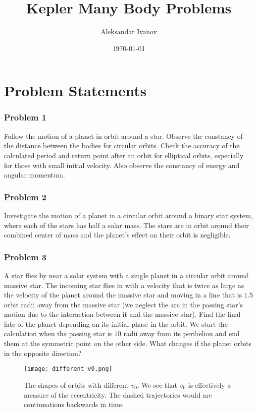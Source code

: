 \documentclass[10pt,a4paper,twocolumn]{article}
\begin{document}
\title{Kepler Many Body Problems}
\author{Aleksandar Ivanov}
\date{\today}
\maketitle

\section{Problem Statements}

\subsubsection*{Problem 1}

Follow the motion of a planet in orbit around a star. Observe the constancy of the distance between the bodies for circular orbits. Check the accuracy of the calculated period and return point after an orbit for elliptical orbits, especially for those with small initial velocity. Also observe the constancy of energy and angular momentum.

\subsubsection*{Problem 2}

Investigate the motion of a planet in a circular orbit around a binary star system, where each of the stars has half a solar mass. The stars are in orbit around their combined center of mass and the planet's effect on their orbit is negligible.

\subsubsection*{Problem 3}

A star flies by near a solar system with a single planet in a circular orbit around massive star. The incoming star flies in with a velocity that is twice as large as the velocity of the planet around the massive star and moving in a line that is $1.5$ orbit radii away from the massive star (we neglect the arc in the passing star's motion due to the interaction between it and the massive star). Find the final fate of the planet depending on its initial phase in the orbit. We start the calculation when the passing star is $10$ radii away from its perihelion and end them at the symmetric point on the other side. What changes if the planet orbits in the opposite direction?

\begin{figure}[t]
    \centering
    \texttt{[image: different\_v0.png]}
    \caption{The shapes of orbits with different $v_0$. We see that $v_0$ is effectively a measure of the eccentricity. The dashed trajectories would are continuations backwards in time.}
    \label{fig:diff_v0}
\end{figure}
\end{document}

